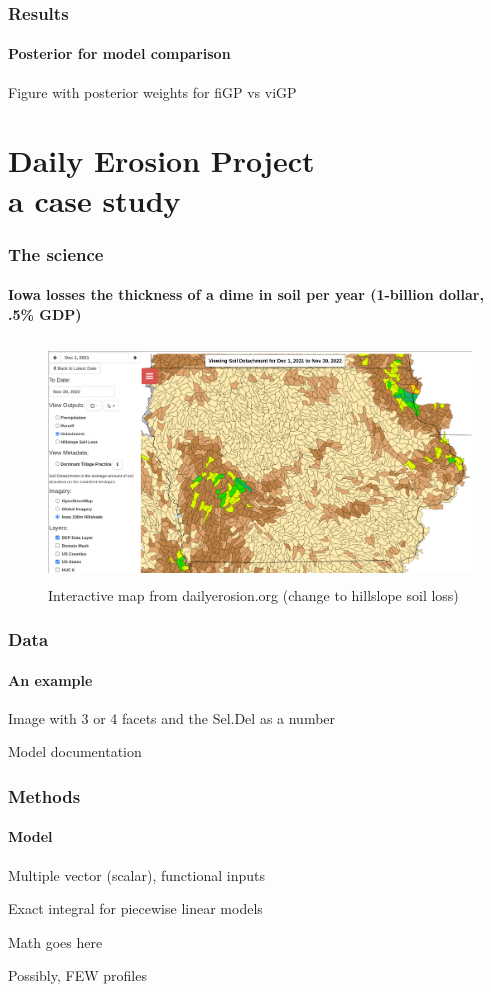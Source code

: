 \documentclass{snedecorbeamer}
\begin{document}
\begin{frame}
  \frametitle{Results}
  \framesubtitle{Posterior for model comparison}

  Figure with posterior weights for fiGP vs viGP
\end{frame}

\section{Daily Erosion Project \\ {\small a case study}}

\begin{frame}
  \frametitle{The science}
  \framesubtitle{Iowa losses the thickness of a dime in soil per year (1-billion
    dollar, .5\% GDP)}

  \begin{figure}
    \centering
    \includegraphics[height=17em]{inc/dep_detachment_map_20220630_168.png}
      \caption{%
        \href{1}{}
        Interactive map from dailyerosion.org (change to hillslope soil loss)}
  \end{figure}
\end{frame}

\begin{frame}
  \frametitle{Data}
  \framesubtitle{An example}

  Image with 3 or 4 facets and the Sel.Del as a number

  {\tiny
    Model documentation}
\end{frame}

\begin{frame}
  \frametitle{Methods}
  \framesubtitle{Model}

  Multiple vector (scalar), functional inputs

  Exact integral for piecewise linear models

  Math goes here

  Possibly, FEW profiles
\end{frame}
\end{document}
